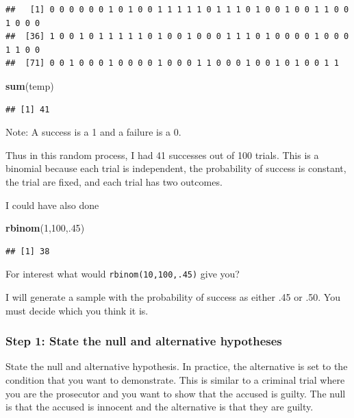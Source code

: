 \documentclass[]{book}
\newenvironment{Shaded}{\begin{snugshade}}{\end{snugshade}}
\newcommand{\KeywordTok}[1]{\textcolor[rgb]{0.13,0.29,0.53}{\textbf{#1}}}
\newcommand{\DecValTok}[1]{\textcolor[rgb]{0.00,0.00,0.81}{#1}}
\newcommand{\NormalTok}[1]{#1}
\theoremstyle{definition}
\theoremstyle{definition}
\theoremstyle{definition}
\theoremstyle{remark}
\begin{document}
\begin{verbatim}
##   [1] 0 0 0 0 0 0 1 0 1 0 0 1 1 1 1 1 0 1 1 1 0 1 0 0 1 0 0 1 1 0 0 1 0 0 0
##  [36] 1 0 0 1 0 1 1 1 1 1 0 1 0 0 1 0 0 0 1 1 1 0 1 0 0 0 0 1 0 0 0 1 1 0 0
##  [71] 0 0 1 0 0 0 1 0 0 0 0 1 0 0 0 1 1 0 0 0 1 0 0 1 0 1 0 0 1 1
\end{verbatim}

\begin{Shaded}
\begin{Highlighting}[]
\KeywordTok{sum}\NormalTok{(temp)}
\end{Highlighting}
\end{Shaded}

\begin{verbatim}
## [1] 41
\end{verbatim}

Note: A success is a 1 and a failure is a 0.

Thus in this random process, I had 41 successes out of 100 trials. This
is a binomial because each trial is independent, the probability of
success is constant, the trial are fixed, and each trial has two
outcomes.

I could have also done

\begin{Shaded}
\begin{Highlighting}[]
\KeywordTok{rbinom}\NormalTok{(}\DecValTok{1}\NormalTok{,}\DecValTok{100}\NormalTok{,.}\DecValTok{45}\NormalTok{)}
\end{Highlighting}
\end{Shaded}

\begin{verbatim}
## [1] 38
\end{verbatim}

For interest what would \texttt{rbinom(10,100,.45)} give you?

I will generate a sample with the probability of success as either .45
or .50. You must decide which you think it is.

\subsubsection{Step 1: State the null and alternative
hypotheses}\label{step-1-state-the-null-and-alternative-hypotheses}

State the null and alternative hypothesis. In practice, the alternative
is set to the condition that you want to demonstrate. This is similar to
a criminal trial where you are the prosecutor and you want to show that
the accused is guilty. The null is that the accused is innocent and the
alternative is that they are guilty.
\end{document}
